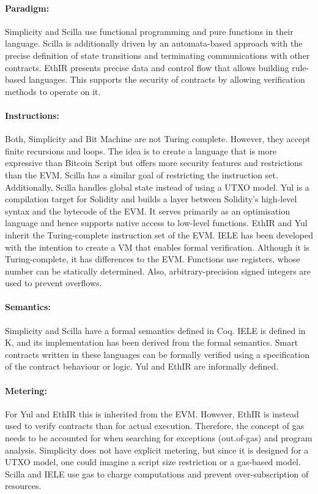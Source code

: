\paragraph{Paradigm:} Simplicity and Scilla use functional programming and pure functions in their language. Scilla is additionally driven by an automata-based approach with the precise definition of state transitions and terminating communications with other contracts.
EthIR presents precise data and control flow that allows building rule-based languages. This supports the security of contracts by allowing verification methods to operate on it.


\paragraph{Instructions:} Both, Simplicity and Bit Machine are not Turing complete. However, they accept finite recursions and loops. The idea is to create a language that is more expressive than Bitcoin Script but offers more security features and restrictions than the EVM. Scilla has a similar goal of restricting the instruction set. Additionally, Scilla handles global state instead of using a UTXO model.
Yul is a compilation target for Solidity and builds a layer between Solidity's high-level syntax and the bytecode of the EVM. It serves primarily as an optimisation language and hence supports native access to low-level functions.
EthIR and Yul inherit the Turing-complete instruction set of the EVM.
IELE has been developed with the intention to create a VM that enables formal verification. Although it is Turing-complete, it has differences to the EVM. Functions use registers, whose number can be statically determined. Also, arbitrary-precision signed integers are used to prevent overflows.

\paragraph{Semantics:} Simplicity and Scilla have a formal semantics defined in Coq. IELE is defined in K, and its implementation has been derived from the formal semantics. Smart contracts written in these languages can be formally verified using a specification of the contract behaviour or logic. Yul and EthIR are informally defined.

\paragraph{Metering:} For Yul and EthIR this is inherited from the EVM. However, EthIR is instead used to verify contracts than for actual execution. Therefore, the concept of gas needs to be accounted for when searching for exceptions (out.of-gas) and program analysis. Simplicity does not have explicit metering, but since it is designed for a UTXO model, one could imagine a script size restriction or a gas-based model.
Scilla and IELE use gas to charge computations and prevent over-subscription of resources.

